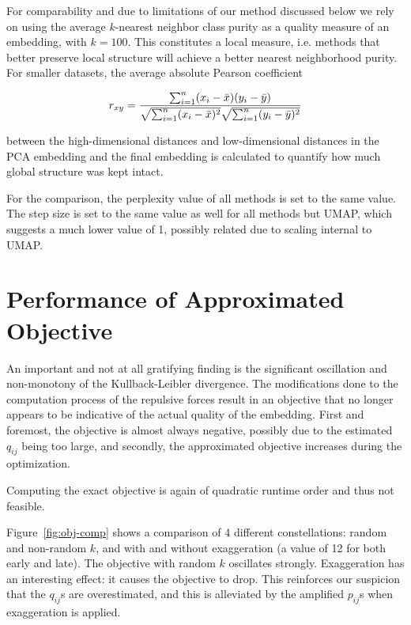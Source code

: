 For comparability and due to limitations of our method discussed below we rely
on using the average $k$-nearest neighbor class purity as a quality measure of
an embedding, with $k = 100$. This constitutes a local measure, i.e. methods
that better preserve local structure will achieve a better nearest neighborhood
purity. For smaller datasets, the average absolute Pearson coefficient

\begin{equation}
  r_{xy} = \frac{\sum_{i = 1}^{n} (x_i - \bar{x})(y_i - \bar{y})}{\sqrt{\sum_{i=1}^{n}(x_i - \bar{x})^2} \sqrt{\sum_{i=1}^{n} (y_i - \bar{y})^2}} \\
\end{equation}

between the high-dimensional distances and low-dimensional distances in the PCA
embedding and the final embedding is calculated to quantify how much global structure
was kept intact.

For the comparison, the perplexity value of all methods is set to the same
value.  The step size is set to the same value as well for all methods but UMAP,
which suggests a much lower value of 1, possibly related due to scaling
internal to UMAP.


\section{Performance of Approximated Objective}

An important and not at all gratifying finding is the significant oscillation
and non-monotony of the Kullback-Leibler divergence. The modifications done to
the computation process of the repulsive forces result in an objective that no
longer appears to be indicative of the actual quality of the embedding. First and
foremost, the objective is almost always negative, possibly due to the estimated $q_{ij}$
being too large, and secondly, the approximated objective increases during the optimization.

Computing the exact objective is again of quadratic runtime order and thus not feasible.

Figure~\ref{fig:obj-comp} shows a comparison of 4 different constellations: random and non-random
$k$, and with and without exaggeration (a value of 12 for both early and late). The objective
with random $k$ oscillates strongly. Exaggeration has an interesting effect: it causes the
objective to drop. This reinforces our suspicion that the $q_{ij}$s are overestimated,
and this is alleviated by the amplified $p_{ij}$s when exaggeration is applied.

